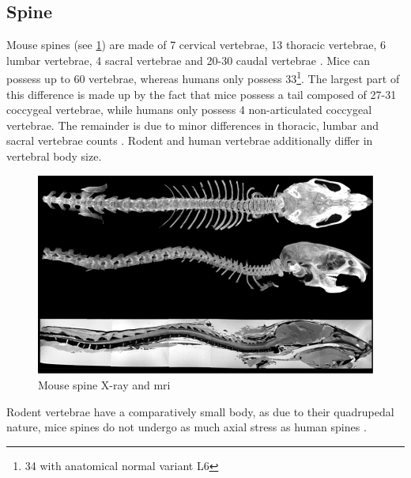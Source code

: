 \subsection{Spine}
\label{s:b-mouse-spine}
Mouse spines (see \cref{fig:mouseSpine}) are made of 7 cervical vertebrae, 13 thoracic vertebrae, 6 lumbar vertebrae, 4 sacral vertebrae and 20-30 caudal vertebrae \cite{platzerTaschenatlasAnatomieBd2013}.
Mice can possess up to 60 vertebrae, whereas humans only possess 33\footnote{34 with anatomical normal variant L6}.
The largest part of this difference is made up by the fact that mice possess a tail composed of 27-31 coccygeal vertebrae,
while humans only possess 4 non-articulated coccygeal vertebrae.
The remainder is due to minor differences in thoracic, lumbar and sacral vertebrae counts \cite{ruberteMorphologicalMousePhenotyping2017,jeromeSkeletalSystem2018,harrisonVertebralLandmarksIdentification2013}.
Rodent and human vertebrae additionally differ in vertebral body size.
\begin{figure}[h]
	\centerline{
		\includegraphics[scale=0.6]{images/mouseSpine.png}}
	\caption{Mouse spine X-ray and \acrshort{mri} \cite{harrisonVertebralLandmarksIdentification2013}}\label{fig:mouseSpine}
\end{figure}

\noindent
Rodent vertebrae have a comparatively small body, as due to their quadrupedal nature,
mice spines do not undergo as much axial stress as human spines \cite{ruberteMorphologicalMousePhenotyping2017,jeromeSkeletalSystem2018,platzerTaschenatlasAnatomieBd2013}.

